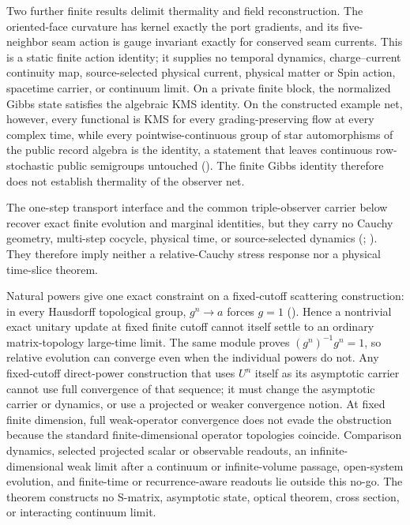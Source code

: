 Two further finite results delimit thermality and field reconstruction.  The
oriented-face curvature has kernel exactly the port gradients, and its
five-neighbor seam action is gauge invariant exactly for conserved seam
currents.  This is a static finite action identity; it supplies no temporal
dynamics, charge--current continuity map, source-selected physical current,
physical matter or Spin action, spacetime carrier, or continuum limit.  On a
private finite block, the normalized Gibbs state satisfies the algebraic KMS
identity.  On the constructed example net, however, every functional is KMS
for every grading-preserving flow at every complex time, while every
pointwise-continuous group of star automorphisms of the public record
algebra is the identity, a statement that leaves continuous row-stochastic
public semigroups untouched
().  The finite Gibbs identity
therefore does not establish thermality of the observer net.

The one-step transport interface and the common triple-observer carrier below
recover exact finite evolution and marginal identities, but they carry no
Cauchy geometry, multi-step cocycle, physical time, or source-selected
dynamics (;
).  They therefore imply neither a
relative-Cauchy stress response nor a physical time-slice theorem.

Natural powers give one exact constraint on a fixed-cutoff scattering
construction: in every Hausdorff topological group, $g^n\to a$ forces
$g=1$ ().  Hence a nontrivial exact
unitary update at fixed finite cutoff cannot itself settle to an ordinary
matrix-topology large-time limit.  The same module proves
$(g^n)^{-1}g^n=1$, so relative evolution can converge even when the individual
powers do not.  Any fixed-cutoff direct-power construction that uses $U^n$
itself as its asymptotic carrier cannot use full convergence of that sequence;
it must change the asymptotic carrier or dynamics, or use a projected or
weaker convergence notion.  At fixed finite dimension, full weak-operator convergence
does not evade the obstruction because the standard finite-dimensional
operator topologies coincide.  Comparison dynamics, selected projected scalar
or observable readouts, an infinite-dimensional weak limit after a continuum or
infinite-volume passage, open-system evolution, and finite-time or
recurrence-aware readouts lie outside this no-go.  The theorem constructs no
S-matrix, asymptotic state, optical theorem, cross section, or interacting
continuum limit.
